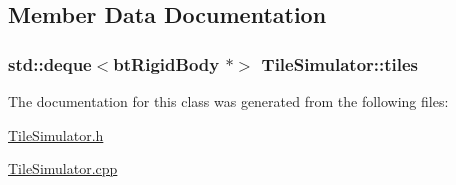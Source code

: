 \subsection{Member Data Documentation}
\hypertarget{classTileSimulator_a58a909f82bf80b79e892f0057366af92}{
\subsubsection[{tiles}]{\setlength{\rightskip}{0pt plus 5cm}std\-::deque$<$bt\-Rigid\-Body $\ast$$>$ Tile\-Simulator\-::tiles\hspace{0.3cm}{\ttfamily [private]}}}\label{classTileSimulator_a58a909f82bf80b79e892f0057366af92}


The documentation for this class was generated from the following files\-:\begin{DoxyCompactItemize}
\item 
\hyperlink{TileSimulator_8h}{Tile\-Simulator.\-h}\item 
\hyperlink{TileSimulator_8cpp}{Tile\-Simulator.\-cpp}\end{DoxyCompactItemize}
